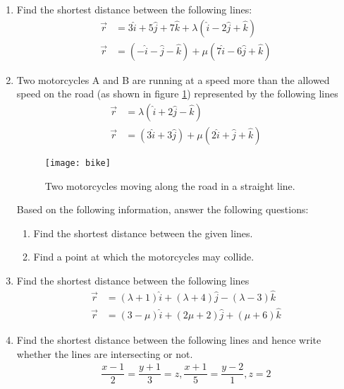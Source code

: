 \begin{enumerate}
	\item Find the shortest distance between the following lines:
		\begin{align}
			\vec{r}&=3\hat{i}+5\hat{j}+7\hat{k}+\lambda(\hat{i}-2\hat{j}+\hat{k})\\\vec{r}&=(-\hat{i}-\hat{j}-\hat{k})+\mu(7\hat{i}-6\hat{j}+\hat{k})
		\end{align}

	\item Two motorcycles A and B are running at a speed more than the allowed speed on the road (as shown in figure \ref{fig:bike1}) represented by the following lines 
		\begin{align}
			\vec{r}&=\lambda(\hat{i}+2\hat{j}-\hat{k})\\\vec{r}&=(3\hat{i}+3\hat{j})+\mu(2\hat{i}+\hat{j}+\hat{k})
		\end{align}
		\begin{figure}[H]
			\centering
			\texttt{[image: bike]}
			\caption{Two motorcycles moving along the road in a straight line.}
			\label{fig:bike1}
		\end{figure}
		Based on the following information, answer the following questions:
		\begin{enumerate}
			\item Find the shortest distance between the given lines.
			\item Find a point at which the motorcycles may collide.
		\end{enumerate}
	
	\item Find the shortest distance between the following lines
		\begin{align}
			\vec{r}&=(\lambda+1)\hat{i}+(\lambda+4)\hat{j}-(\lambda-3)\hat{k}\\\vec{r}&=(3-\mu)\hat{i}+(2\mu+2)\hat{j}+(\mu+6)\hat{k}
		\end{align}
	
	\item Find the shortest distance between the following lines and hence write whether the lines are intersecting or not.
		\begin{align}
			\dfrac{x-1}{2}=\dfrac{y+1}{3}=z, \dfrac{x+1}{5}=\dfrac{y-2}{1}, z=2
		\end{align}
\end{enumerate}
%

